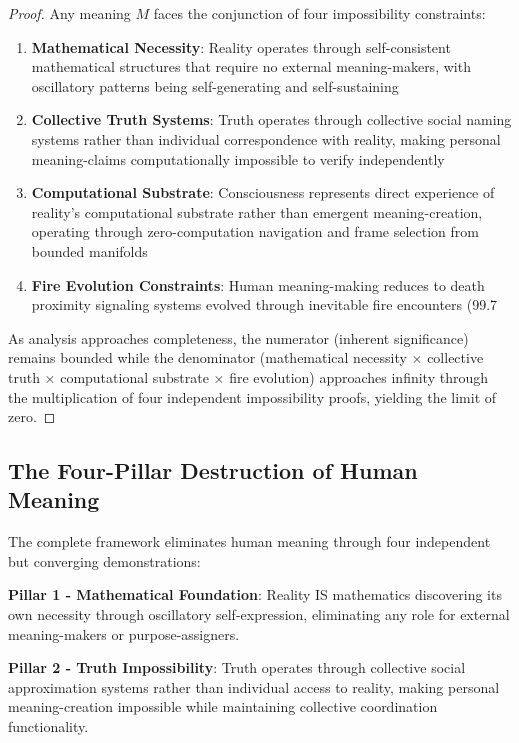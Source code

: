 \documentclass[12pt,a4paper]{article}
\begin{document}
\begin{proof}
Any meaning $M$ faces the conjunction of four impossibility constraints:

\begin{enumerate}
\item \textbf{Mathematical Necessity}: Reality operates through self-consistent mathematical structures that require no external meaning-makers, with oscillatory patterns being self-generating and self-sustaining

\item \textbf{Collective Truth Systems}: Truth operates through collective social naming systems rather than individual correspondence with reality, making personal meaning-claims computationally impossible to verify independently

\item \textbf{Computational Substrate}: Consciousness represents direct experience of reality's computational substrate rather than emergent meaning-creation, operating through zero-computation navigation and frame selection from bounded manifolds

\item \textbf{Fire Evolution Constraints}: Human meaning-making reduces to death proximity signaling systems evolved through inevitable fire encounters (99.7%
\end{enumerate}

As analysis approaches completeness, the numerator (inherent significance) remains bounded while the denominator (mathematical necessity × collective truth × computational substrate × fire evolution) approaches infinity through the multiplication of four independent impossibility proofs, yielding the limit of zero.
\end{proof}

\subsection{The Four-Pillar Destruction of Human Meaning}

The complete framework eliminates human meaning through four independent but converging demonstrations:

\textbf{Pillar 1 - Mathematical Foundation}: Reality IS mathematics discovering its own necessity through oscillatory self-expression, eliminating any role for external meaning-makers or purpose-assigners.

\textbf{Pillar 2 - Truth Impossibility}: Truth operates through collective social approximation systems rather than individual access to reality, making personal meaning-creation impossible while maintaining collective coordination functionality.
\end{document}
